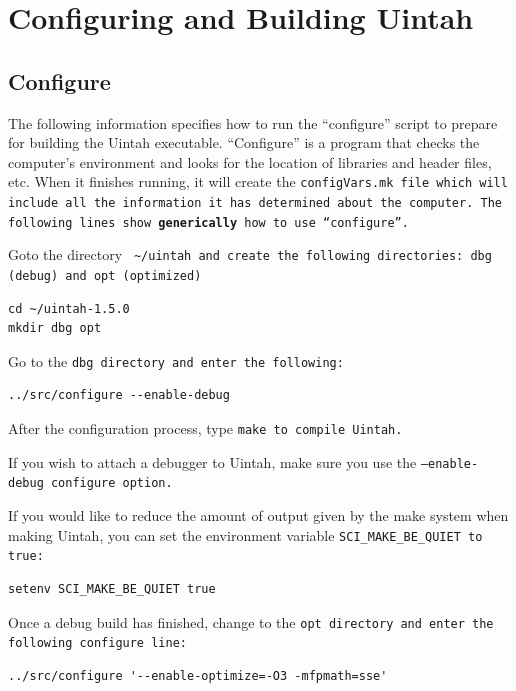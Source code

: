 \documentclass[12pt]{article}
\newcommand{\TT}[1]{\tt{#1} \normalfont}
\begin{document}
\section{Configuring and Building Uintah}

\subsection{Configure}

The following information specifies how to run the ``configure''
script to prepare for building the Uintah executable.  ``Configure''
is a program that checks the computer's environment and looks for the
location of libraries and header files, etc.  When it finishes
running, it will create the \TT{configVars.mk} file which will include all
the information it has determined about the computer.  The following
lines show \textbf{generically} how to use ``configure''.

Goto the directory \TT{ \textasciitilde/uintah} and create the
following directories: \TT{dbg} (debug) and \TT{opt} (optimized)

\begin{verbatim}
cd ~/uintah-1.5.0
mkdir dbg opt
\end{verbatim}

Go to the \TT{dbg} directory and enter the following:

\begin{verbatim}
../src/configure --enable-debug        
\end{verbatim}


After the configuration process, type \TT{make} to compile Uintah.

If you wish to attach a debugger to Uintah, make sure you use the \TT{--enable-debug} configure option.

If you would like to reduce the amount of output given by the make system when making Uintah, 
you can set the environment variable \TT{SCI\_MAKE\_BE\_QUIET} to true:

\begin{verbatim}
setenv SCI_MAKE_BE_QUIET true
\end{verbatim}

Once a debug build has finished, change to the \TT{opt} directory and
enter the following configure line:

\begin{verbatim}
../src/configure '--enable-optimize=-O3 -mfpmath=sse' 
\end{verbatim}
\end{document}
